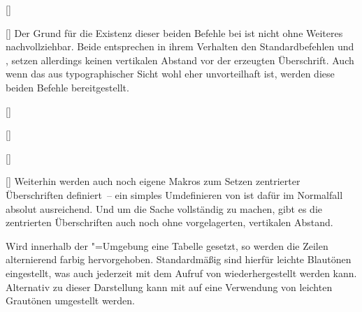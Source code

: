 \begin{Bundle*}{}
\begin{Declaration}{%
  []%
}
\begin{Declaration}{%
  []%
}
\printdeclarationlist%
%
Der Grund für die Existenz dieser beiden Befehle bei  ist 
nicht ohne Weiteres nachvollziehbar. Beide entsprechen in ihrem Verhalten den 
Standardbefehlen  und , setzen allerdings 
keinen vertikalen Abstand vor der erzeugten Überschrift. Auch wenn das aus 
typographischer Sicht wohl eher unvorteilhaft ist, werden diese beiden Befehle 
bereitgestellt.
\end{Declaration}
\end{Declaration}

\begin{Declaration}{%
  []%
}
\begin{Declaration}{%
  []%
}
\begin{Declaration}{%
  []%
}
\begin{Declaration}{%
  []%
}
\printdeclarationlist%
%
Weiterhin werden auch noch eigene Makros zum Setzen zentrierter Überschriften 
definiert~-- ein simples Umdefinieren von  ist dafür im 
Normalfall absolut ausreichend. Und um die Sache vollständig zu machen, gibt es 
die zentrierten Überschriften auch noch ohne vorgelagerten, vertikalen Abstand.
\end{Declaration}
\end{Declaration}
\end{Declaration}
\end{Declaration}

\begin{Declaration}{}
\begin{Declaration}{}
\begin{Declaration}{}
\printdeclarationlist%
%
Wird innerhalb der "=Umgebung eine Tabelle gesetzt, 
so werden die Zeilen alternierend farbig hervorgehoben. Standardmäßig sind 
hierfür leichte Blautönen eingestellt, was auch jederzeit mit dem Aufruf von 
 wiederhergestellt werden kann. Alternativ zu dieser 
Darstellung kann mit  auf eine Verwendung von leichten 
Grautönen umgestellt werden.
\end{Declaration}
\end{Declaration}
\end{Declaration}


\end{Bundle*}
